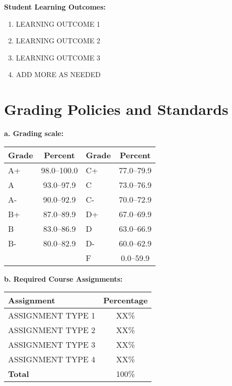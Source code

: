 \documentclass[12pt]{article}
\begin{document}
\vspace{1em}
\noindent \textbf{Student Learning Outcomes:}
\begin{enumerate}
\item LEARNING OUTCOME 1
\item LEARNING OUTCOME 2
\item LEARNING OUTCOME 3
\item ADD MORE AS NEEDED
\end{enumerate}

\section*{Grading Policies and Standards}

\noindent \textbf{a. Grading scale:}

\begin{center}
\begin{tabular}{|l|c||l|c|}
\hline
\textbf{Grade} & \textbf{Percent} & \textbf{Grade} & \textbf{Percent} \\
\hline
A+ & 98.0--100.0 & C+ & 77.0--79.9 \\
A  & 93.0--97.9  & C  & 73.0--76.9 \\
A- & 90.0--92.9  & C- & 70.0--72.9 \\
B+ & 87.0--89.9  & D+ & 67.0--69.9 \\
B  & 83.0--86.9  & D  & 63.0--66.9 \\
B- & 80.0--82.9  & D- & 60.0--62.9 \\
   &             & F  & 0.0--59.9 \\
\hline
\end{tabular}
\end{center}

\vspace{1em}
\noindent \textbf{b. Required Course Assignments:}

\begin{center}
\begin{tabular}{|l|c|}
\hline
\textbf{Assignment} & \textbf{Percentage} \\
\hline
ASSIGNMENT TYPE 1 & XX\% \\
ASSIGNMENT TYPE 2 & XX\% \\
ASSIGNMENT TYPE 3 & XX\% \\
ASSIGNMENT TYPE 4 & XX\% \\
\hline
\textbf{Total} & 100\% \\
\hline
\end{tabular}
\end{center}
\end{document}

